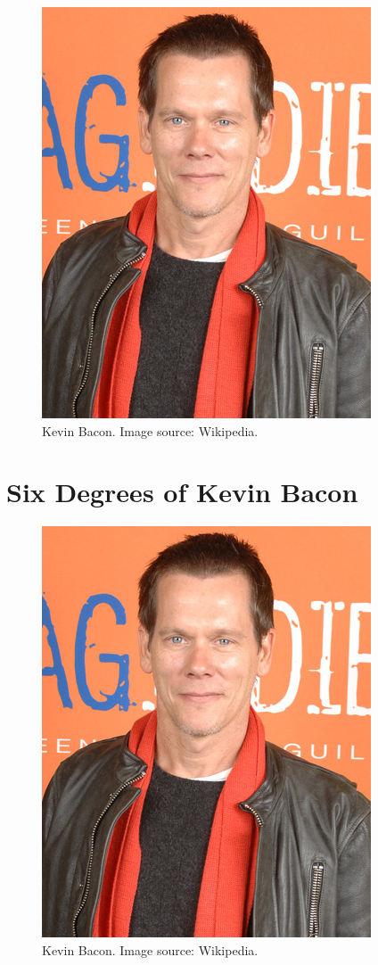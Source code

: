 \begin{figure}[h]
\includegraphics[scale = .4]{Kevin_Bacon.jpg}
\caption{Kevin Bacon.  Image source: Wikipedia.}
\end{figure}

\section*{Six Degrees of Kevin Bacon}
\begin{figure}[h]
\includegraphics[scale = .4]{Kevin_Bacon.jpg}
\caption{Kevin Bacon.  Image source: Wikipedia.}
\end{figure}

